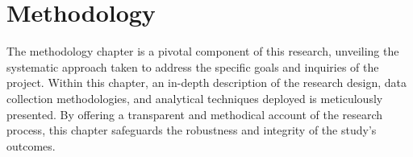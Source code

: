 \chapter{Methodology}
The methodology chapter is a pivotal component of this research, unveiling the systematic approach taken to address the specific goals and inquiries of the project. Within this chapter, an in-depth description of the research design, data collection methodologies, and analytical techniques deployed is meticulously presented. By offering a transparent and methodical account of the research process, this chapter safeguards the robustness and integrity of the study's outcomes.








